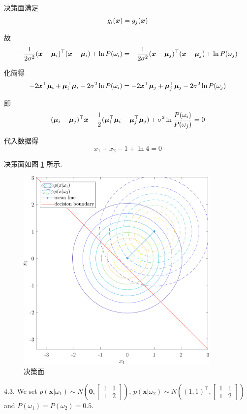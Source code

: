 \documentclass{article}
\begin{document}
决策面满足
\begin{equation}
  g_i(\bm{x})=g_j(\bm{x})
\end{equation}

故
\begin{equation}
  -\frac{1}{2\sigma^2}(\bm{x}-\bm{\mu}_i)^{\top}(\bm{x}-\bm{\mu}_i)+\ln P(\omega_i)=-\frac{1}{2\sigma^2}(\bm{x}-\bm{\mu}_j)^{\top}(\bm{x}-\bm{\mu}_j)+\ln P(\omega_j)
\end{equation}

化简得
\begin{equation}
  -2\bm{x}^{\top}\bm{\mu}_i+\bm{\mu}_i^{\top}\bm{\mu}_i-2\sigma^2\ln P(\omega_i)
  =-2\bm{x}^{\top}\bm{\mu}_j+\bm{\mu}_j^{\top}\bm{\mu}_j-2\sigma^2\ln P(\omega_j)
\end{equation}

即
\begin{equation}
  (\bm{\mu}_i-\bm{\mu}_j)^{\top}\bm{x}-\frac{1}{2}(\bm{\mu}_i^{\top}\bm{\mu}_i-\bm{\mu}_j^{\top}\bm{\mu}_j)+\sigma^2\ln\frac{P(\omega_i)}{P(\omega_j)}=0
\end{equation}

代入数据得
\begin{equation}
  x_1+x_2-1+\ln4=0
\end{equation}

决策面如图 \ref{fig:mvnpdf-2} 所示.

\begin{figure}
  \centering
  \includegraphics[width=10cm]{mvnpdf-2.pdf}
  \caption{决策面}
  \label{fig:mvnpdf-2}
\end{figure}

4.3. We set $p(\bm{x}|\omega_1)\sim N\left(\bm{0},\begin{bmatrix} 1 & 1 \\ 1 & 2 \end{bmatrix}\right)$, $p(\bm{x}|\omega_2)\sim N\left((1,1)^{\top},\begin{bmatrix} 1 & 1 \\ 1 & 2 \end{bmatrix}\right)$ and $P(\omega_1)=P(\omega_2)=0.5$.
\end{document}
